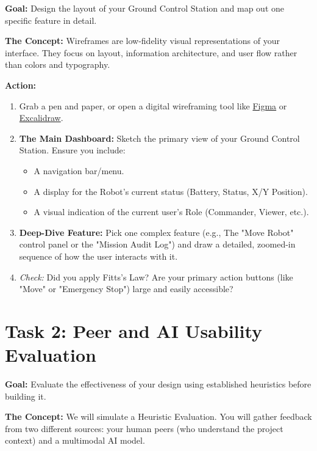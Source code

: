 \documentclass[a4paper,12pt]{article}
\begin{document}
\textbf{Goal:} Design the layout of your Ground Control Station and map out one specific feature in detail.

\textbf{The Concept:} Wireframes are low-fidelity visual representations of your interface. They focus on layout, information architecture, and user flow rather than colors and typography.

\vspace{0.3cm}
\textbf{Action:}
\begin{enumerate}
    \item Grab a pen and paper, or open a digital wireframing tool like \href{https://www.figma.com/}{Figma} or \href{https://excalidraw.com/}{Excalidraw}.
    \item \textbf{The Main Dashboard:} Sketch the primary view of your Ground Control Station. Ensure you include:
    \begin{itemize}
        \item A navigation bar/menu.
        \item A display for the Robot's current status (Battery, Status, X/Y Position).
        \item A visual indication of the current user's Role (Commander, Viewer, etc.).
    \end{itemize}
    \item \textbf{Deep-Dive Feature:} Pick one complex feature (e.g., The "Move Robot" control panel or the "Mission Audit Log") and draw a detailed, zoomed-in sequence of how the user interacts with it.
    \item \textit{Check:} Did you apply Fitts's Law? Are your primary action buttons (like "Move" or "Emergency Stop") large and easily accessible?
\end{enumerate}


\section*{Task 2: Peer and AI Usability Evaluation}

\textbf{Goal:} Evaluate the effectiveness of your design using established heuristics before building it.

\textbf{The Concept:} We will simulate a Heuristic Evaluation. You will gather feedback from two different sources: your human peers (who understand the project context) and a multimodal AI model.
\end{document}
